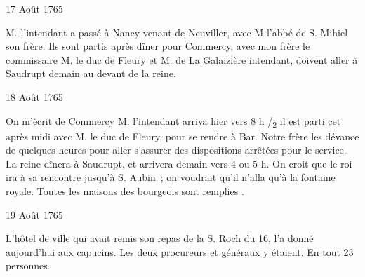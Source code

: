                      \begin{diary}{17 Août 1765}{}
                        
                        
                           M. l'intendant a passé à
                              Nancy venant
                           de Neuviller, avec M l'abbé de S. Mihiel
                           son frère. Ils sont partis après dîner
                           pour Commercy, avec mon frère le commissaire
                           M. le duc de Fleury et M. de La Galaizière
                              intendant, doivent aller à Saudrupt demain
                           au devant de la
                           reine. \bigskip
        
        
                     \end{diary}

                     \begin{diary}{18 Août 1765}{}
                        
                         On m'écrit de Commercy
                           \og M. l'intendant
                              arriva hier vers 8 h /\textsubscript{2} il est parti cet après
                              midi avec M. le duc de Fleury,
                              pour se rendre
                              à Bar. Notre frère les dévance de quelques
                              heures pour aller s'assurer des dispositions
                              arrêtées pour le service. La reine dînera
                              à Saudrupt, et arrivera
                                 demain vers 4 ou 5 h.
                              On croit que le roi ira
                              à sa rencontre jusqu'à
                              S. Aubin ; on voudrait
                              qu'il n'alla qu'à la
                                 fontaine royale. Toutes les maisons des
                              bourgeois sont remplies \fg{}. \bigskip
        
        
                     \end{diary}

                     \begin{diary}{19 Août 1765}{}
                        
                        
                           L'hôtel de ville qui avait remis son
                           repas
                           de la S. Roch
                           du 16, l'a donné aujourd'hui
                           aux capucins. Les deux procureurs et généraux
                           y étaient. En tout 23 personnes. \bigskip
        
        
                     \end{diary}

